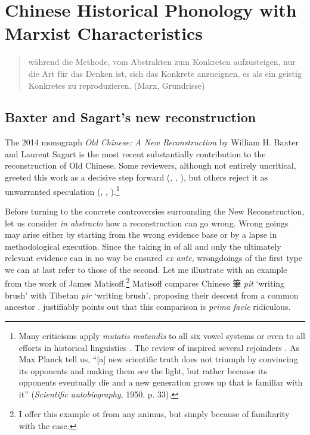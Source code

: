 \chapter{Chinese Historical Phonology with Marxist Characteristics}
\label{chapter-1.-Introduction}

\begin{quote}
während die Methode, vom Abstrakten zum Konkreten aufzusteigen, nur
die Art für das Denken ist, sich das Konkrete anzueignen, es als ein geistig Konkretes zu reproduzieren.
(Marx, Grundrisse)
\end{quote}


\section{Baxter and Sagart's new reconstruction}
The 2014 monograph \textit{Old Chinese: A New Reconstruction} by William H. Baxter and Laurent Sagart is the most recent substantially contribution to the reconstruction of Old Chinese. 
Some reviewers, although not entirely uncritical,  greeted this work as a decisive step forward  (\cite{Starostin2015},
  \cite{Goldstein2015},  
  \cite{Hill2017OCreview}), but others 
reject it as unwarranted speculation  (\cite{Schuessler2015BSrv}, 
  \cite{Ho2016}, 
  \cite[]{Harbsmeier2016}).\footnote{Many
  criticisms apply \emph{mutatis mutandis} to all six vowel systems \citep[esp. pp. 183-184]{Ho2016} or even to all efforts in historical
  linguistics \citep[esp. pp. 484-487]{Harbsmeier2016}. The review of \citet[]{Ho2016} inspired several rejoinders \citep{jacques17buyang,Ma2019HoReply, List2016n}. As Max Planck tell us, ``[a] new scientific truth does not triumph by convincing its opponents and making them see the light, but rather because its opponents eventually die and a new generation grows up that is familiar with it'' (\textit{Scientific autobiography}, 1950, p. 33).} 

Before turning to the concrete controversies surrounding the New Reconstruction, let us consider \textit{in abstracto} how a reconstruction can go wrong. Wrong goings may arise either by starting from the wrong evidence base or by a lapse in methodological execution. Since the taking in of all and only the ultimately relevant evidence can in no way be ensured \textit{ex ante}, wrongdoings of the first type we can at last refer to those of the second. Let me illustrate with an example from the work of James Matisoff.\footnote{I offer this example ot from any animus, but simply because of familiarity with the case.} 
Matisoff 
compares Chinese 筆 \textit{pit} 
`writing brush' with Tibetan 
{}
\textit{pir} `writing brush', proposing their descent from a common ancestor \citeyearpar[504]{Matisoff2003}. 
\citet[215]{sagart06review} justifiably points out that this comparison is \textit{prima facie} ridiculous. 

